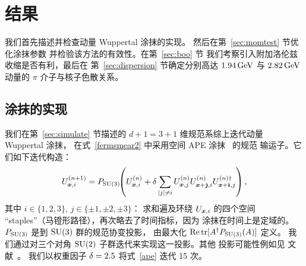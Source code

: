 \section{结果}
\label{sec:results}
我们首先描述并检查动量 Wuppertal 涂抹的实现。
然后在第~\ref{sec:momtest} 节优化涂抹参数
并检验该方法的有效性。在第~\ref{sec:boo} 节
我们考察引入附加洛伦兹收缩是否有利，最后在
第~\ref{sec:dispersion} 节确定分别高达 $1.94\,\textmd{GeV}$ 与 $2.82\,\textmd{GeV}$
动量的 $\pi$ 介子与核子色散关系。

\subsection{涂抹的实现}
我们在第~\ref{sec:simulate} 节描述的
$d+1=3+1$ 维规范系综上迭代动量 Wuppertal 涂抹，
在式~\eqref{fermsmear2} 中采用空间 APE 涂抹~\cite{Falcioni:1984ei} 的规范
输运子。它们如下迭代构造：
\begin{equation}
\label{ape}
U_{\boldsymbol{x},i}^{(n+1)}= P_{\textmd{SU}(3)}\!\!\left(U_{\boldsymbol{x},i}^{(n)}+\delta\sum_{|j|\neq i}
U_{\boldsymbol{x},j}^{(n)}U^{(n)}_{\boldsymbol{x}+\hat{\boldsymbol{\jmath}},i}U^{(n)\dagger}_{\boldsymbol{x}+\hat{\boldsymbol{\imath}},j}\right),
\end{equation}
其中 $i\in\{1,2,3\}$, $j\in\{\pm 1,\pm 2,\pm 3\}$：
求和遍及环绕
$U_{\boldsymbol{x},i}$ 的四个空间 ``staples''（马镫形路径），再次略去了时间指标，因为
涂抹在时间上是定域的。$P_{\textmd{SU}(3)}$ 是到 $\textmd{SU}(3)$ 群的规范协变投影，
由最大化 $\mathop{\textmd{Re}}\nolimits\mathop{\textmd{tr}}\nolimits[A^{\dagger} P_{\textmd{SU}(3)}(A)]$ 定义。
我们通过对三个对角
$\textmd{SU}(2)$ 子群迭代来实现这一投影。其他
投影可能性例如见
文献~\cite{Morningstar:2003gk,Bali:2005fu}。
我们以权重因子 $\delta=2.5$
将式~\eqref{ape} 迭代 15 次。

